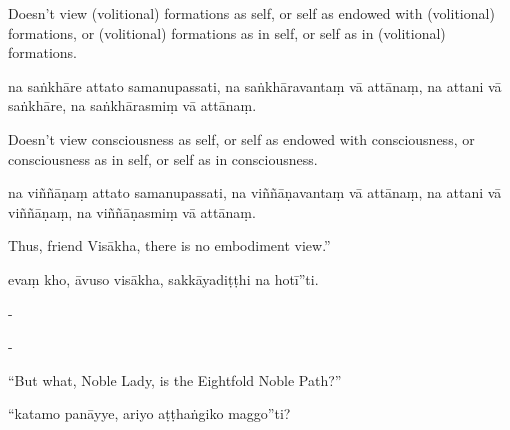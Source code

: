 \begin{samepage}
\begin{leftcolumn*}
Doesn’t view (volitional) formations as self, or self as endowed with (volitional) formations, or (volitional) formations as in self, or self as in (volitional) formations.
\end{leftcolumn*}

\begin{rightcolumn}
na saṅkhāre attato samanupassati, na saṅkhāravantaṃ vā attānaṃ, na attani vā saṅkhāre, na saṅkhārasmiṃ vā attānaṃ.
\end{rightcolumn}
\end{samepage}

\begin{samepage}
\begin{leftcolumn*}
Doesn’t view consciousness as self, or self as endowed with consciousness, or consciousness as in self, or self as in consciousness.
\end{leftcolumn*}

\begin{rightcolumn}
na viññāṇaṃ attato samanupassati, na viññāṇavantaṃ vā attānaṃ, na attani vā viññāṇaṃ, na viññāṇasmiṃ vā attānaṃ.
\end{rightcolumn}
\end{samepage}

\begin{samepage}
\begin{leftcolumn*}
Thus, friend Visākha, there is no embodiment view.”
\end{leftcolumn*}

\begin{rightcolumn}
evaṃ kho, āvuso visākha, sakkāyadiṭṭhi na hotī”ti.
\end{rightcolumn}
\end{samepage}

\begin{samepage}
\begin{leftcolumn*}
-
\end{leftcolumn*}

\begin{rightcolumn}
-
\end{rightcolumn}
\end{samepage}

\begin{samepage}
\begin{leftcolumn*}
“But what, Noble Lady, is the Eightfold Noble Path?”
\end{leftcolumn*}

\begin{rightcolumn}
“katamo panāyye, ariyo aṭṭhaṅgiko maggo”ti?
\end{rightcolumn}
\end{samepage}

